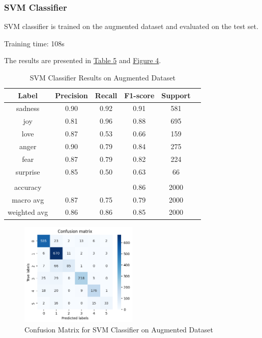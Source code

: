 \documentclass{article}
\begin{document}
\subsubsection{SVM Classifier}
SVM classifier is trained on the augmented dataset and evaluated on the test set.

Training time: 108s

The results are presented in \hyperref[table:svm_results_3]{Table 5} and \hyperref[fig:svm_confusion_matrix_3]{Figure 4}.

\begin{table}[h]
    \label{table:svm_results_3}
\centering
\begin{tabular}{|c|c|c|c|c|c|}
\hline
\textbf{Label} & \textbf{Precision} & \textbf{Recall} & \textbf{F1-score} & \textbf{Support} \\ \hline
sadness        & 0.90               & 0.92            & 0.91              & 581              \\ \hline
joy            & 0.81               & 0.96            & 0.88              & 695              \\ \hline
love           & 0.87               & 0.53            & 0.66              & 159              \\ \hline
anger          & 0.90               & 0.79            & 0.84              & 275              \\ \hline
fear           & 0.87               & 0.79            & 0.82              & 224              \\ \hline
surprise       & 0.85               & 0.50            & 0.63              & 66               \\ \hline
&  &  &  &  \\ \hline
accuracy       &                     &                 & 0.86              & 2000             \\ \hline
macro avg      & 0.87               & 0.75            & 0.79              & 2000             \\ \hline
weighted avg   & 0.86               & 0.86            & 0.85              & 2000             \\ \hline
\end{tabular}
\bigskip
\caption{SVM Classifier Results on Augmented Dataset}
\end{table}

\begin{figure}[h]
    \label{fig:svm_confusion_matrix_3}
    \centering
    \includegraphics[width=0.5\textwidth]{confusion_matrix_3_svm.png}
    \caption{Confusion Matrix for SVM Classifier on Augmented Dataset}
\end{figure}
\end{document}
